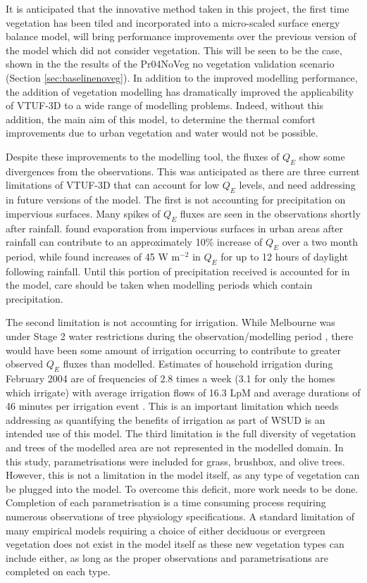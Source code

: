 \documentclass[final,3p,times,authoryear]{elsarticle}
\begin{document}
It is anticipated that the innovative method taken in this project, the first time vegetation has been tiled and incorporated into a micro-scaled surface energy balance model, will bring performance improvements over the previous version of the model which did not consider vegetation. This will be seen to be the case, shown in the the results of the Pr04NoVeg no vegetation validation scenario (Section \ref{sec:baselinenoveg}). In addition to the improved modelling performance, the addition of vegetation modelling has dramatically improved the applicability of VTUF-3D to a wide range of modelling problems. Indeed, without this addition, the main aim of this model, to determine the thermal comfort improvements due to urban vegetation and water would not be possible. 

Despite these improvements to the modelling tool, the fluxes of $Q_{E}$ show some divergences from the observations. This was anticipated as there are three current limitations of VTUF-3D that can account for low $Q_{E}$ levels, and need addressing in future versions of the model. The first is not accounting for precipitation on impervious surfaces. Many spikes of $Q_{E}$ fluxes are seen in the observations shortly after rainfall. \cite{Demuzere2014} found evaporation from impervious surfaces in urban areas after rainfall can contribute to an approximately 10\% increase of $Q_{E}$ over a two month period, while \cite{Wouters2013} found increases of 45 W m$^{-2}$ in $Q_{E}$ for up to 12 hours of daylight following rainfall. Until this portion of precipitation received is accounted for in the model, care should be taken when modelling periods which contain precipitation.

The second limitation is not accounting for irrigation. While Melbourne was under Stage 2 water restrictions during the observation/modelling period \citep{MelbourneWater2016a}, there would have been some amount of irrigation occurring to contribute to greater observed $Q_{E}$ fluxes than modelled. Estimates of household irrigation during February 2004 are of frequencies of 2.8 times a week (3.1 for only the homes which irrigate) with average irrigation flows of 16.3 LpM and average durations of 46 minutes per irrigation event \citep{Roberts2005}. This is an important limitation which needs addressing as quantifying the benefits of irrigation as part of WSUD is an intended use of this model. The third limitation is the full diversity of vegetation and trees of the modelled area are not represented in the modelled domain. In this study, parametrisations were included for grass, brushbox, and olive trees. However, this is not a limitation in the model itself, as any type of vegetation can be plugged into the model. To overcome this deficit, more work needs to be done. Completion of each parametrisation is a time consuming process requiring numerous observations of tree physiology specifications. A standard limitation of many empirical models requiring a choice of either deciduous or evergreen vegetation does not exist in the model itself as these new vegetation types can include either, as long as the proper observations and parametrisations are completed on each type.
\end{document}
